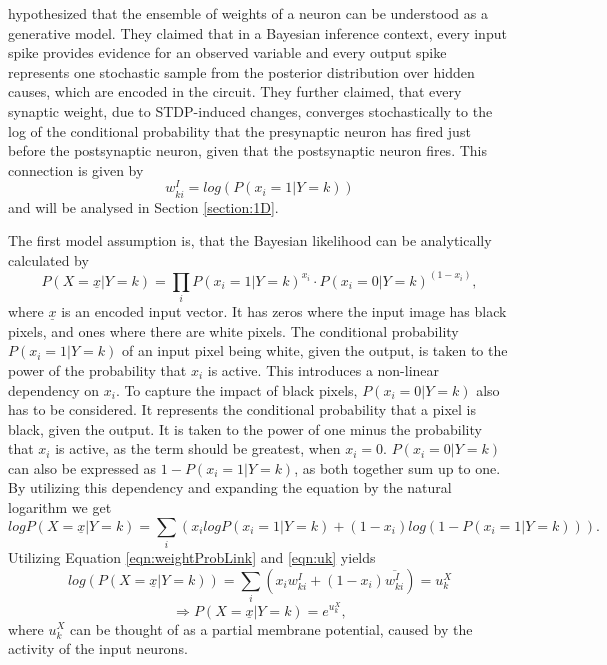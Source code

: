 \citet{nessler} hypothesized that the ensemble of weights of a neuron can be understood as a generative model. They claimed that in a Bayesian inference context, every input spike provides evidence for an observed variable and every output spike represents one stochastic sample from the posterior distribution over hidden causes, which are encoded in the circuit. They further claimed, that every synaptic weight, due to STDP-induced changes,  converges stochastically to the log of the conditional probability that the presynaptic neuron has fired just before the postsynaptic neuron, given that the postsynaptic neuron fires. This connection is given by
\begin{equation}
\label{eqn:weightProbLink}
 w^{I}_{ki} = log(P(x_i = 1 | Y = k))
\end{equation}
and will be analysed in Section \ref{section:1D}.

The first model assumption is, that the Bayesian likelihood can be analytically calculated by
\begin{equation}
\label{eqn:P1}
P(X=\underline{x}|Y=k) = \prod_i P(x_i=1|Y=k)^{x_i} \cdot P(x_i=0|Y=k)^{(1-x_i)},
\end{equation}
where $\underline{x}$ is an encoded input vector. It has zeros where the input image has black pixels, and ones where there are white pixels. The conditional probability $P(x_i=1|Y=k)$ of an input pixel being white, given the output, is taken to the power of the probability that $x_i$ is active. This introduces a non-linear dependency on $x_i$. To capture the impact of black pixels, $P(x_i=0|Y=k)$ also has to be considered. It represents the conditional probability that a pixel is black, given the output. It is taken to the power of one minus the probability that $x_i$ is active, as the term should  be greatest, when $x_i = 0$.
$P(x_i=0|Y=k)$ can also be expressed as $1 - P(x_i=1|Y=k)$, as both together sum up to one. By utilizing this dependency and  expanding the equation by the natural logarithm we get
\begin{equation}
log P(X=\underline{x}|Y=k) = \sum_i (x_i log P(x_i=1|Y=k) + (1-x_i) log (1 - P(x_i=1|Y=k))).
\end{equation}
Utilizing Equation \ref{eqn:weightProbLink} and \ref{eqn:uk}  yields
\begin{equation}
log(P(X=\underline{x}|Y=k)) = \sum_i (x_i w^I_{ki} + (1-x_i)\overline{w^I_{ki}}) = u^X_k
\end{equation}
\begin{equation}
\Rightarrow P(X=\underline{x}|Y=k) = e^{u^X_k},
\end{equation}
where $u^X_k$ can be thought of as a partial membrane potential, caused by the activity of the input neurons.

